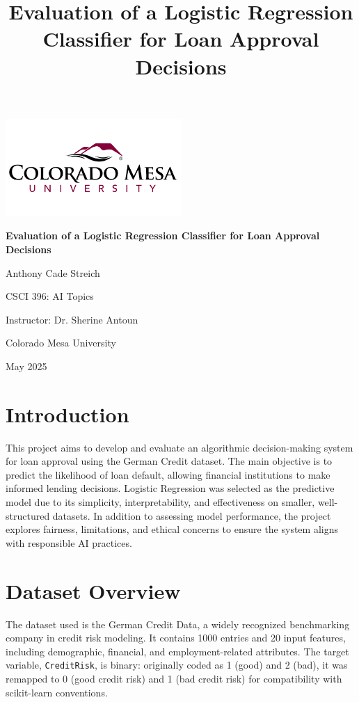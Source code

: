 \documentclass[12pt]{article}
\title{Evaluation of a Logistic Regression Classifier for Loan Approval Decisions}
\author{}
\date{}
\begin{document}
	
	\begin{titlepage}
	\centering
	\vspace*{2cm}
	
	\includegraphics[width=0.5\textwidth]{CMU Logo}
	\vspace{1cm}
	
	{\Huge \bfseries Evaluation of a Logistic Regression Classifier for Loan Approval Decisions \par}
	\vspace{1.5cm}
	
	{\Large Anthony Cade Streich \par}
	\vspace{0.5cm}
	
	CSCI 396: AI Topics \par
	Instructor: Dr. Sherine Antoun \par
	Colorado Mesa University \par
	\vfill
	
	{\large May 2025 \par}
\end{titlepage}
	
	\section{Introduction}
	This project aims to develop and evaluate an algorithmic decision-making system for loan approval using the German Credit dataset. The main objective is to predict the likelihood of loan default, allowing financial institutions to make informed lending decisions. Logistic Regression was selected as the predictive model due to its simplicity, interpretability, and effectiveness on smaller, well-structured datasets. In addition to assessing model performance, the project explores fairness, limitations, and ethical concerns to ensure the system aligns with responsible AI practices.
	
	\section{Dataset Overview}
	The dataset used is the German Credit Data, a widely recognized benchmarking company in credit risk modeling. It contains 1000 entries and 20 input features, including demographic, financial, and employment-related attributes. The target variable, \texttt{CreditRisk}, is binary: originally coded as 1 (good) and 2 (bad), it was remapped to 0 (good credit risk) and 1 (bad credit risk) for compatibility with scikit-learn conventions.
	
\end{document}
